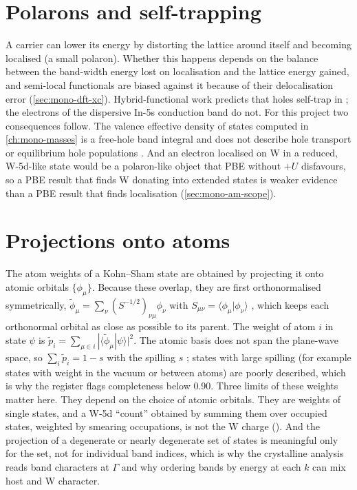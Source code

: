 \section{Polarons and self-trapping}
\label{sec:mono-defect-polaron}

A carrier can lower its energy by distorting the lattice around itself and becoming localised (a small polaron). Whether
this happens depends on the balance between the band-width energy lost on localisation and the lattice energy gained,
and semi-local functionals are biased against it because of their delocalisation error
(\cref{sec:mono-dft-xc}). Hybrid-functional work predicts that holes self-trap in \InO{} \citep{Varley2012}; the
electrons of the dispersive In-5s conduction band do not. For this project two consequences follow. The valence
effective density of states computed in \cref{ch:mono-masses} is a free-hole band integral and does not describe hole
transport or equilibrium hole populations . And an electron localised on W in a reduced, W-5d-like state
would be a polaron-like object that PBE without $+U$ disfavours, so a PBE result that finds W donating into extended
states is weaker evidence than a PBE result that finds localisation (\cref{sec:mono-am-scope}).

\section{Projections onto atoms}
\label{sec:mono-defect-lowdin}

The atom weights of a Kohn--Sham state are obtained by projecting it onto atomic orbitals $\{\phi_\mu\}$. Because these
overlap, they are first orthonormalised symmetrically, $\tilde\phi_\mu = \sum_\nu (S^{-1/2})_{\nu\mu}\phi_\nu$ with
$S_{\mu\nu} = \langle\phi_\mu|\phi_\nu\rangle$ \citep{Lowdin1950}, which keeps each orthonormal orbital as close as
possible to its parent. The weight of atom $i$ in state $\psi$ is $\tilde p_i = \sum_{\mu\in i}|\langle\tilde\phi_\mu|\psi\rangle|^2$.
The atomic basis does not span the plane-wave space, so $\sum_i\tilde p_i = 1-s$ with the spilling $s$
\citep{SanchezPortal1995}; states with large spilling (for example states with weight in the vacuum or between atoms)
are poorly described, which is why the register flags completeness below 0.90. Three limits of these weights matter
here. They depend on the choice of atomic orbitals. They are weights of single states, and a W-5d ``count'' obtained by
summing them over occupied states, weighted by smearing occupations, is not the W charge (). And the
projection of a degenerate or nearly degenerate set of states is meaningful only for the set, not for individual band
indices, which is why the crystalline analysis reads band characters at $\Gamma$ and why ordering bands by energy at each
$k$ can mix host and W character.

